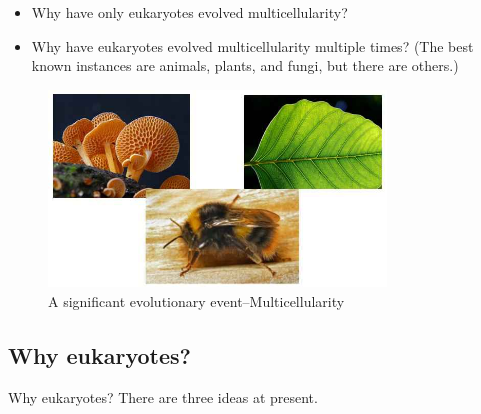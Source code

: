 \documentclass[]{article}
\begin{document}
\begin{itemize}
	\item Why have only eukaryotes evolved multicellularity?
	\item Why have eukaryotes evolved multicellularity multiple times? (The best known instances are animals, plants, and fungi, but there are others.)
\end{itemize}

\begin{figure}[H]
	\caption{A significant evolutionary event--Multicellularity}\label{fig:multicellularity}
	\includegraphics[width=0.8\textwidth]{multicellularity}
\end{figure}

\subsection{Why eukaryotes?}
Why eukaryotes? There are three ideas at present.
\end{document}
